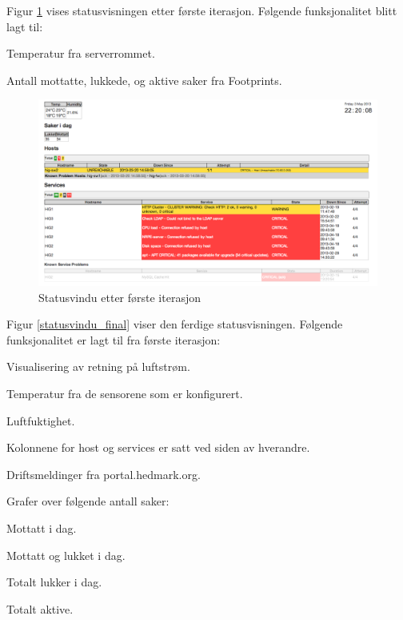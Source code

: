 Figur \ref{statusvindu_first} vises statusvisningen etter første iterasjon. Følgende funksjonalitet blitt lagt til:
\begin{itemize*}
	\item Temperatur fra serverrommet.
	\item Antall mottatte, lukkede, og aktive saker fra Footprints.
\end{itemize*}

\begin{figure}[H]
    \centering
    \includegraphics[scale=0.3]{img/statusvindu_first}
    \caption{Statusvindu etter første iterasjon}
    \label{statusvindu_first}
\end{figure}

Figur \ref{statusvindu_final} viser den ferdige statusvisningen. Følgende funksjonalitet er lagt til fra første iterasjon:

\begin{itemize*}
	\item Visualisering av retning på luftstrøm.
	\item Temperatur fra de sensorene som er konfigurert.
	\item Luftfuktighet.
	\item Kolonnene for host og services er satt ved siden av hverandre.
	\item Driftsmeldinger fra portal.hedmark.org.
	\item Grafer over følgende antall saker: 
	\begin{itemize*}
		\item Mottatt i dag.
		\item Mottatt og lukket i dag.
		\item Totalt lukker i dag.
		\item Totalt aktive.
	\end{itemize*}
\end{itemize*}

